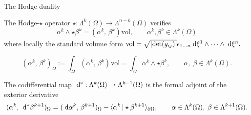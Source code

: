 \documentclass[aspectratio=169]{beamer}
\newcommand{\inpr}[3][]{\ensuremath{( #2, \, #3 )_{#1}}}
\newcommand{\dualpr}[3][]{\ensuremath{\langle #2 \, \vert #3 \rangle_{#1}}}
\begin{document}
\begin{frame}{The Hodge duality}
	
	
	\begin{definition}
		The Hodge-$\star$ operator $\star : \Lambda^k(\Omega) \rightarrow \Lambda^{n-k}(\Omega)$ verifies 
		\begin{equation*}
			\alpha^k \wedge \star \beta^k = \inpr{\alpha^k}{\beta^k} \mathrm{vol}, \qquad \alpha^k, \beta^k \in \Lambda^k(\Omega)
		\end{equation*}
		where locally the standard volume form $\mathrm{vol} = \sqrt{|\mathrm{det}(g_{ij})|}\epsilon_{1 \dots n}\d\xi^1 \wedge \dots \wedge \d\xi^n.$	
\end{definition}

\begin{definition}
	\begin{equation*}
		\inpr[\Omega]{\alpha^k}{\beta^k} := \int_\Omega \inpr{\alpha^k}{\beta^k} \mathrm{vol} = \int_\Omega \alpha^k \wedge \star \beta^k, \qquad \alpha, \; \beta \in \Lambda^{k}(\Omega).
	\end{equation*}
\end{definition}

\begin{definition}[Codifferential]
	The codifferential  map $\d{}^{*} : \Lambda^k(\Omega) \xrightarrow{} \Lambda^{k-1}(\Omega)$ is the formal  adjoint of the exterior derivative
	\begin{equation*}
		\inpr[\Omega]{\alpha^k}{\d{}^* \beta^{k+1}} = \inpr[\Omega]{\d \alpha^{k}}{\beta^{k+1}} - \dualpr[\partial \Omega]{\alpha^{k}}{\star \beta^{k+1}}, \qquad \alpha \in \Lambda^k(\Omega), \; \beta \in \Lambda^{k+1}(\Omega).
	\end{equation*}
\end{definition}


\end{frame}
\end{document}
